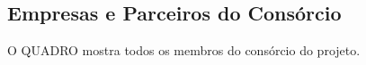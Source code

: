 
\begin{apendicesenv}

\chapter{Empresas e Parceiros do Consórcio}\label{ap:parceiros}

O QUADRO mostra todos os membros do consórcio do projeto. 

\end{apendicesenv}
